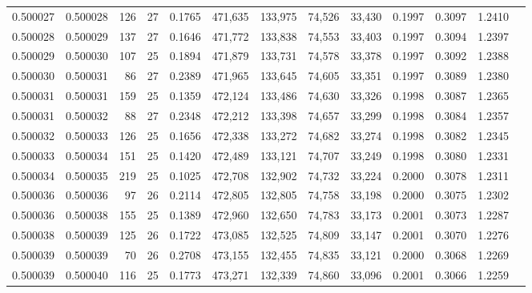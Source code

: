 \begin{tabular}{rrrrrrrrrrrrr}
0.500027 & 0.500028 & 126 &  27 &                                     0.1765 & 471,635 & 133,975 &  74,526 &  33,430 & 0.1997 & 0.3097 & 1.2410 \\
0.500028 & 0.500029 & 137 &  27 &                                     0.1646 & 471,772 & 133,838 &  74,553 &  33,403 & 0.1997 & 0.3094 & 1.2397 \\
0.500029 & 0.500030 & 107 &  25 &                                     0.1894 & 471,879 & 133,731 &  74,578 &  33,378 & 0.1997 & 0.3092 & 1.2388 \\
0.500030 & 0.500031 &  86 &  27 &                                     0.2389 & 471,965 & 133,645 &  74,605 &  33,351 & 0.1997 & 0.3089 & 1.2380 \\
0.500031 & 0.500031 & 159 &  25 &                                     0.1359 & 472,124 & 133,486 &  74,630 &  33,326 & 0.1998 & 0.3087 & 1.2365 \\
0.500031 & 0.500032 &  88 &  27 &                                     0.2348 & 472,212 & 133,398 &  74,657 &  33,299 & 0.1998 & 0.3084 & 1.2357 \\
0.500032 & 0.500033 & 126 &  25 &                                     0.1656 & 472,338 & 133,272 &  74,682 &  33,274 & 0.1998 & 0.3082 & 1.2345 \\
0.500033 & 0.500034 & 151 &  25 &                                     0.1420 & 472,489 & 133,121 &  74,707 &  33,249 & 0.1998 & 0.3080 & 1.2331 \\
0.500034 & 0.500035 & 219 &  25 &                                     0.1025 & 472,708 & 132,902 &  74,732 &  33,224 & 0.2000 & 0.3078 & 1.2311 \\
0.500036 & 0.500036 &  97 &  26 &                                     0.2114 & 472,805 & 132,805 &  74,758 &  33,198 & 0.2000 & 0.3075 & 1.2302 \\
0.500036 & 0.500038 & 155 &  25 &                                     0.1389 & 472,960 & 132,650 &  74,783 &  33,173 & 0.2001 & 0.3073 & 1.2287 \\
0.500038 & 0.500039 & 125 &  26 &                                     0.1722 & 473,085 & 132,525 &  74,809 &  33,147 & 0.2001 & 0.3070 & 1.2276 \\
0.500039 & 0.500039 &  70 &  26 &                                     0.2708 & 473,155 & 132,455 &  74,835 &  33,121 & 0.2000 & 0.3068 & 1.2269 \\
0.500039 & 0.500040 & 116 &  25 &                                     0.1773 & 473,271 & 132,339 &  74,860 &  33,096 & 0.2001 & 0.3066 & 1.2259 \\

\end{tabular}
